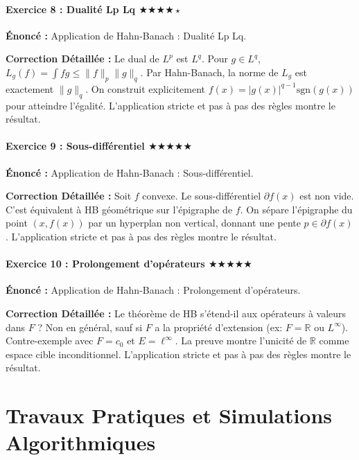 \documentclass[11pt,a4paper]{article}
\begin{document}
\subsection*{Exercice 8 : Dualité Lp Lq \quad $\bigstar\bigstar\bigstar\bigstar\star$}

\textbf{Énoncé :}
Application de Hahn-Banach : Dualité Lp Lq.

\textbf{Correction Détaillée :}
Le dual de $L^p$ est $L^q$. Pour $g \in L^q$, $L_g(f) = \int fg \le \|f\|_p \|g\|_q$. Par Hahn-Banach, la norme de $L_g$ est exactement $\|g\|_q$. On construit explicitement $f(x) = |g(x)|^{q-1} \text{sgn}(g(x))$ pour atteindre l'égalité.
L'application stricte et pas à pas des règles montre le résultat.


\subsection*{Exercice 9 : Sous-différentiel \quad $\bigstar\bigstar\bigstar\bigstar\bigstar$}

\textbf{Énoncé :}
Application de Hahn-Banach : Sous-différentiel.

\textbf{Correction Détaillée :}
Soit $f$ convexe. Le sous-différentiel $\partial f(x)$ est non vide. C'est équivalent à HB géométrique sur l'épigraphe de $f$. On sépare l'épigraphe du point $(x, f(x))$ par un hyperplan non vertical, donnant une pente $p \in \partial f(x)$.
L'application stricte et pas à pas des règles montre le résultat.


\subsection*{Exercice 10 : Prolongement d'opérateurs \quad $\bigstar\bigstar\bigstar\bigstar\bigstar$}

\textbf{Énoncé :}
Application de Hahn-Banach : Prolongement d'opérateurs.

\textbf{Correction Détaillée :}
Le théorème de HB s'étend-il aux opérateurs à valeurs dans $F$ ? Non en général, sauf si $F$ a la propriété d'extension (ex: $F=\mathbb{R}$ ou $L^\infty$). Contre-exemple avec $F=c_0$ et $E=\ell^\infty$. La preuve montre l'unicité de $\mathbb{R}$ comme espace cible inconditionnel.
L'application stricte et pas à pas des règles montre le résultat.



\part{Travaux Pratiques et Simulations Algorithmiques}
\end{document}
